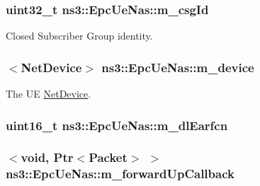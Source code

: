 \subsubsection[{\texorpdfstring{m\+\_\+csg\+Id}{m_csgId}}]{\setlength{\rightskip}{0pt plus 5cm}uint32\+\_\+t ns3\+::\+Epc\+Ue\+Nas\+::m\+\_\+csg\+Id\hspace{0.3cm}{\ttfamily [private]}}\hypertarget{classns3_1_1EpcUeNas_a5b08a427d4ff0ded01a32ad92c24f015}{}\label{classns3_1_1EpcUeNas_a5b08a427d4ff0ded01a32ad92c24f015}


Closed Subscriber Group identity. 

\subsubsection[{\texorpdfstring{m\+\_\+device}{m_device}}]{$<${\bf Net\+Device}$>$ ns3\+::\+Epc\+Ue\+Nas\+::m\+\_\+device\hspace{0.3cm}{\ttfamily [private]}}\hypertarget{classns3_1_1EpcUeNas_ab873c88a58c003b9756e1f65661e45e3}{}\label{classns3_1_1EpcUeNas_ab873c88a58c003b9756e1f65661e45e3}


The UE \hyperlink{classns3_1_1NetDevice}{Net\+Device}. 

\subsubsection[{\texorpdfstring{m\+\_\+dl\+Earfcn}{m_dlEarfcn}}]{\setlength{\rightskip}{0pt plus 5cm}uint16\+\_\+t ns3\+::\+Epc\+Ue\+Nas\+::m\+\_\+dl\+Earfcn\hspace{0.3cm}{\ttfamily [private]}}\hypertarget{classns3_1_1EpcUeNas_a4c7c7d17d9ac2bc5481f367a218d7d33}{}\label{classns3_1_1EpcUeNas_a4c7c7d17d9ac2bc5481f367a218d7d33}
\subsubsection[{\texorpdfstring{m\+\_\+forward\+Up\+Callback}{m_forwardUpCallback}}]{$<$void, {\bf Ptr}$<${\bf Packet}$>$ $>$ ns3\+::\+Epc\+Ue\+Nas\+::m\+\_\+forward\+Up\+Callback\hspace{0.3cm}{\ttfamily [private]}}\hypertarget{classns3_1_1EpcUeNas_a389c1feab2167b9f7a0e81436ca0554b}{}\label{classns3_1_1EpcUeNas_a389c1feab2167b9f7a0e81436ca0554b}
